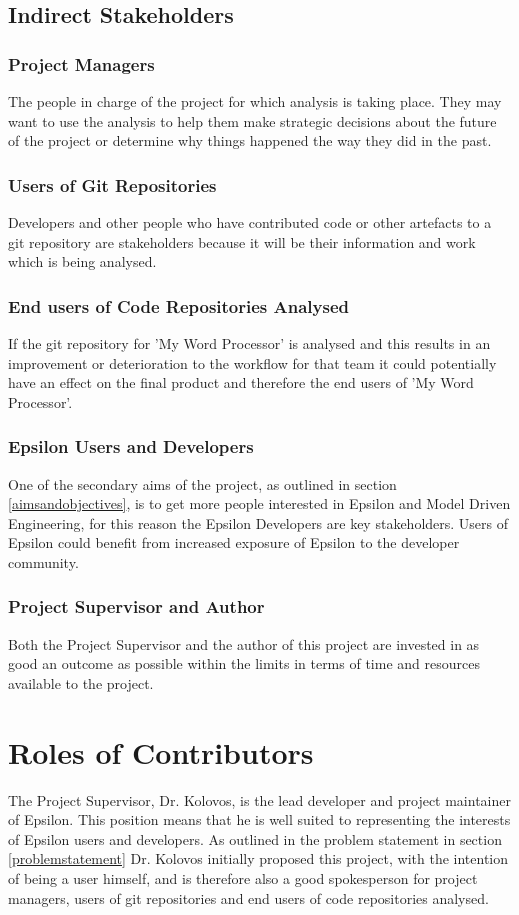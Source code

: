 \documentclass[11pt]{book}
\begin{document}
\subsection{Indirect Stakeholders}
\subsubsection{Project Managers}
The people in charge of the project for which analysis is taking place. They may want to use the analysis to help them make strategic decisions about the future of the project or determine why things happened the way they did in the past.

\subsubsection{Users of Git Repositories}
Developers and other people who have contributed code or other artefacts to a git repository are stakeholders because it will be their information and work which is being analysed.

\subsubsection{End users of Code Repositories Analysed}
If the git repository for 'My Word Processor' is analysed and this results in an improvement or deterioration to the workflow for that team it could potentially have an effect on the final product and therefore the end users of 'My Word Processor'. 

\subsubsection{Epsilon Users and Developers}
One of the secondary aims of the project, as outlined in section \ref{aimsandobjectives}, is to get more people interested in Epsilon and Model Driven Engineering, for this reason the Epsilon Developers are key stakeholders. Users of Epsilon could benefit from increased exposure of Epsilon to the developer community.

\subsubsection{Project Supervisor and Author}
Both the Project Supervisor and the author of this project are invested in as good an outcome as possible within the limits in terms of time and resources available to the project. 

\section{Roles of Contributors}
The Project Supervisor, Dr. Kolovos, is the lead developer and project maintainer of Epsilon. This position means that he is well suited to representing the interests of Epsilon users and developers. As outlined in the problem statement in section \ref{problemstatement} Dr. Kolovos initially proposed this project, with the intention of being a user himself, and is therefore also a good spokesperson for project managers, users of git repositories and end users of code repositories analysed.
\end{document}
